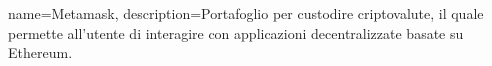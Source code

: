 {
	name={Metamask},
	description={Portafoglio per custodire criptovalute, il quale permette all'utente di interagire con applicazioni decentralizzate basate su Ethereum.}
}

